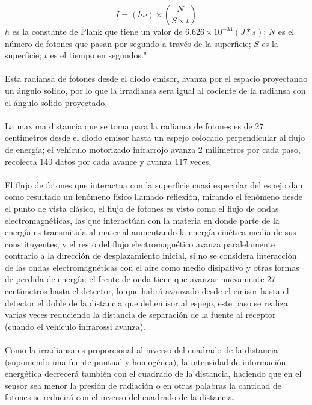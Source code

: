 \documentclass[12]{article}
\begin{document}
\begin{multicols}{2}
\begin{equation}
I = (h\nu)\times \left ( \frac{N}{S\times t } \right)
\end{equation}
$h$ es la constante de Plank que tiene un valor de $6.626 \times 10^{-34} (J * s)$; $N$ es el número de fotones que pasan por segundo a través de la superficie; $S$ es la superficie; $t$ es el tiempo en segundos."\cite{FISICA_MODERNA}\\ \\
Esta radiansa de fotones desde el diodo emisor, avanza por el espacio proyectando un ángulo solido, por lo que la irradiansa  sera igual al cociente de la radiansa con el ángulo solido proyectado.\\\\
La maxima distancia que se toma para la radiansa de fotones es de 27 centimetros desde el diodo emisor hasta un espejo colocado perpendicular al flujo de energía; el vehículo motorizado infrarrojo avanza 2 milímetros por cada paso, recolecta 140 datos por cada avance y avanza 117 veces.\\ \\
El flujo de fotones que interactua con la superficie cuasi especular del espejo dan como resultado un fenómeno físico llamado reflexión, mirando el fenómeno desde el punto de vista clásico, el flujo de fotones  es  visto como el flujo de ondas electromagnéticas,   las que interactúan con la materia  en donde parte de la energía es transmitida al material aumentando la energía cinética media de sus constituyentes, y el resto del flujo electromagnético avanza paralelamente contrario a la dirección de desplazamiento inicial, si no se considera interacción de las ondas electromagnéticas con el aire como medio disipativo  y otras formas de perdida de energía; el frente de onda tiene que avanzar nuevamente 27 centímetros hasta el detector, lo que habrá avanzado desde el emisor hasta el detector el doble de la distancia que del emisor al espejo, este paso se realiza varias veces reduciendo la distancia de separación de la fuente al receptor (cuando el vehículo infrarossi avanza).\\\\
Como la irradiansa es proporcional al inverso del cuadrado de la distancia (suponiendo una fuente puntual y homogénea), la intensidad de información energética decrecerá también con el cuadrado de la distancia, haciendo que en el sensor sea menor la presión de radiación o en otras palabras la cantidad de fotones se reducirá con el inverso del cuadrado de la distancia.\\\\

\end{multicols}
\end{document}
